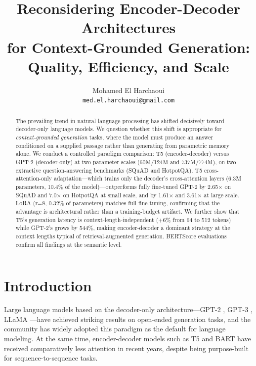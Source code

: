 \documentclass[11pt]{article}
\title{\textbf{Reconsidering Encoder-Decoder Architectures\\
for Context-Grounded Generation:\\
Quality, Efficiency, and Scale}}
\author{
  Mohamed El Harchaoui \\
  \texttt{med.el.harchaoui@gmail.com}
}
\date{}
\newcommand{\squad}{SQuAD\xspace}
\newcommand{\hotpotqa}{HotpotQA\xspace}
\begin{document}
\maketitle

\begin{abstract}
The prevailing trend in natural language processing has shifted decisively toward
decoder-only language models. We question whether this shift is appropriate for
\emph{context-grounded generation} tasks, where the model must produce an answer
conditioned on a supplied passage rather than generating from parametric memory alone.
We conduct a controlled paradigm comparison: T5 (encoder-decoder) versus GPT-2
(decoder-only) at two parameter scales (60M/124M and 737M/774M), on two extractive
question-answering benchmarks (\squad and \hotpotqa).
T5 cross-attention-only adaptation---which trains only the decoder's cross-attention
layers (6.3M parameters, 10.4\% of the model)---outperforms fully fine-tuned GPT-2
by 2.65$\times$ on \squad and 7.0$\times$ on \hotpotqa at small scale, and by
1.61$\times$ and 3.61$\times$ at large scale.
LoRA (r=8, 0.32\% of parameters) matches full fine-tuning,
confirming that the advantage is architectural rather than a training-budget artifact.
We further show that T5's generation latency is context-length-independent
(+6\% from 64 to 512 tokens) while GPT-2's grows by 544\%, making encoder-decoder
a dominant strategy at the context lengths typical of retrieval-augmented generation.
BERTScore evaluations confirm all findings at the semantic level.
\end{abstract}

\section{Introduction}

Large language models based on the decoder-only architecture---GPT-2
\citep{radford2019language}, GPT-3 \citep{brown2020language}, LLaMA
\citep{touvron2023llama}---have achieved striking results on open-ended generation
tasks, and the community has widely adopted this paradigm as the default for
language modeling.
At the same time, encoder-decoder models such as T5 \citep{raffel2020exploring}
and BART \citep{lewis2020bart} have received comparatively less attention in recent
years, despite being purpose-built for sequence-to-sequence tasks.
\end{document}
